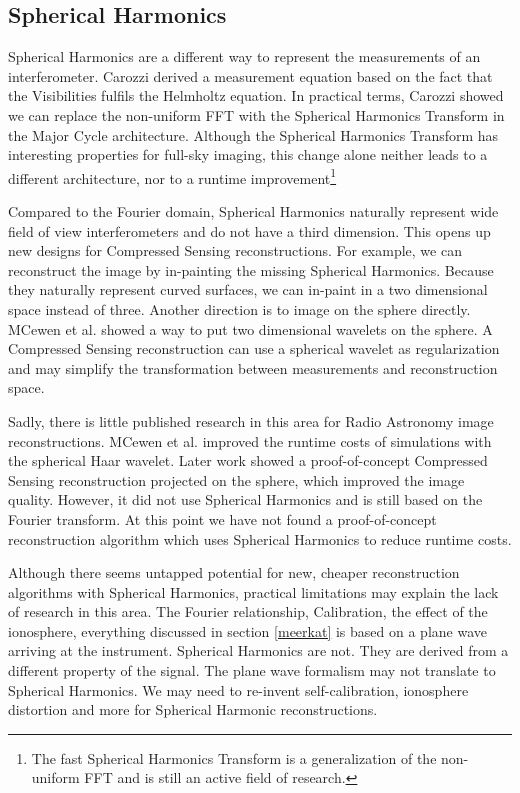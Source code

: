 \subsection{Spherical Harmonics}
Spherical Harmonics are a different way to represent the measurements of an interferometer. Carozzi\cite{carozzi2015imaging} derived a measurement equation based on the fact that the Visibilities fulfils the Helmholtz equation. In practical terms, Carozzi showed we can replace the non-uniform FFT with the Spherical Harmonics Transform in the Major Cycle architecture. Although the Spherical Harmonics Transform has interesting properties for full-sky imaging, this change alone neither leads to a different architecture, nor to a runtime improvement\footnote{The fast Spherical Harmonics Transform is a generalization of the non-uniform FFT\cite{kunisnonequispaced} and is still an active field of research\cite{schaeffer2013efficient}.}

Compared to the Fourier domain, Spherical Harmonics naturally represent wide field of view interferometers and do not have a third dimension. This opens up new designs for Compressed Sensing reconstructions. For example, we can reconstruct the image by in-painting the missing Spherical Harmonics. Because they naturally represent curved surfaces, we can in-paint in a two dimensional space instead of three. Another direction is to image on the sphere directly. MCewen et al.\cite{mcewen2008simulating} showed a way to put two dimensional wavelets on the sphere. A Compressed Sensing reconstruction can use a spherical wavelet as regularization and may simplify the transformation between measurements and reconstruction space.

Sadly, there is little published research in this area for Radio Astronomy image reconstructions. MCewen et al.\cite{mcewen2008simulating} improved the runtime costs of simulations with the spherical Haar wavelet. Later work\cite{mcewen2011compressed} showed a proof-of-concept Compressed Sensing reconstruction projected on the sphere, which improved the image quality. However, it did not use Spherical Harmonics and \cite{mcewen2011compressed} is still based on the Fourier transform. At this point we have not found a proof-of-concept reconstruction algorithm which uses Spherical Harmonics to reduce runtime costs. 

Although there seems untapped potential for new, cheaper reconstruction algorithms with Spherical Harmonics, practical limitations may explain the lack of research in this area. The Fourier relationship, Calibration, the effect of the ionosphere, everything discussed in section \ref{meerkat} is based on a plane wave arriving at the instrument\cite{thompson1986interferometry, smirnov2011revisiting}. Spherical Harmonics are not. They are derived from a different property of the signal. The plane wave formalism may not translate to Spherical Harmonics. We may need to re-invent self-calibration, ionosphere distortion and more for Spherical Harmonic reconstructions.


